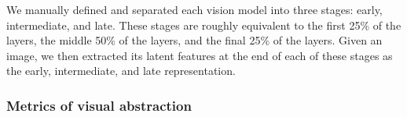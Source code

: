 \documentclass[10pt,letterpaper]{article}
\begin{document}


We manually defined and separated each vision model into three stages: early, intermediate, and late. These stages are roughly equivalent to the first 25\% of the layers, the middle 50\% of the layers, and the final 25\% of the layers. 
Given an image, we then extracted its latent features at the end of each of these stages as the early, intermediate, and late representation.

\subsubsection{Metrics of visual abstraction} 
\end{document}
